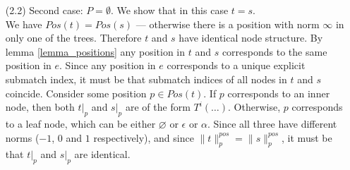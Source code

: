 \documentclass[AMA,STIX1COL]{WileyNJD-v2}
\newcommand{\pnorm}[2]{\|{#1}\|^{pos}_{#2}}
\begin{document}
\begin{proofEnd}
\begin{itemize}[itemsep=0.5em, topsep=0.5em]
\begin{itemize}[itemsep=0.5em]
                \item[(2.2)] Second case: $P = \emptyset$.
                    We show that in this case $t = s$.
                    \\[0.5em]
                    We have $Pos(t) = Pos(s)$ --- otherwise there is a position with norm $\infty$ in only one of the trees.
                    Therefore $t$ and $s$ have identical node structure.
                    By lemma \ref{lemma_positions} any position in $t$ and $s$ corresponds to the same position in $e$.
                    Since any position in $e$ corresponds to a unique explicit submatch index,
                    it must be that submatch indices of all nodes in $t$ and $s$ coincide.
                    Consider some position $p \in Pos(t)$.
                    If $p$ corresponds to an inner node, then both $t|_p$ and $s|_p$ are of the form $T^i(\hdots)$.
                    Otherwise, $p$ corresponds to a leaf node, which can be either $\varnothing$ or $\epsilon$ or $\alpha$.
                    Since all three have different norms ($-1$, $0$ and $1$ respectively),
                    and since $\pnorm{t}{p} = \pnorm{s}{p}$, it must be that $t|_p$ and $s|_p$ are identical.
            \end{itemize}
    \end{itemize}
\end{proofEnd}
\vspace{-0.5em}
\end{document}
